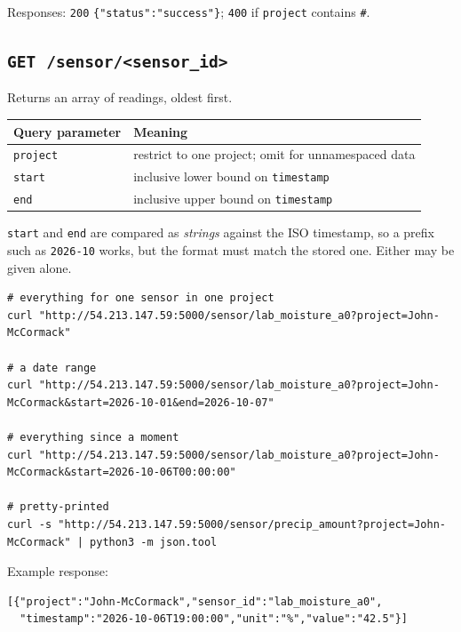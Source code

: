 \documentclass[11pt,a4paper]{article}
\newcommand{\http}[2]{\texttt{\textbf{#1}}~\texttt{#2}}
\begin{document}
\noindent Responses: \texttt{200} \texttt{\{"status":"success"\}};
\texttt{400} if \texttt{project} contains \texttt{\#}.

\subsection{\http{GET}{/sensor/<sensor\_id>}}

Returns an array of readings, oldest first.

\begin{center}
\begin{tabular}{@{}lp{10.4cm}@{}}
\toprule
Query parameter & Meaning \\
\midrule
\texttt{project} & restrict to one project; omit for unnamespaced data \\
\texttt{start}   & inclusive lower bound on \texttt{timestamp} \\
\texttt{end}     & inclusive upper bound on \texttt{timestamp} \\
\bottomrule
\end{tabular}
\end{center}

\noindent \texttt{start} and \texttt{end} are compared as \emph{strings}
against the ISO timestamp, so a prefix such as \texttt{2026-10} works, but
the format must match the stored one. Either may be given alone.

\begin{lstlisting}
# everything for one sensor in one project
curl "http://54.213.147.59:5000/sensor/lab_moisture_a0?project=John-McCormack"

# a date range
curl "http://54.213.147.59:5000/sensor/lab_moisture_a0?project=John-McCormack&start=2026-10-01&end=2026-10-07"

# everything since a moment
curl "http://54.213.147.59:5000/sensor/lab_moisture_a0?project=John-McCormack&start=2026-10-06T00:00:00"

# pretty-printed
curl -s "http://54.213.147.59:5000/sensor/precip_amount?project=John-McCormack" | python3 -m json.tool
\end{lstlisting}

\noindent Example response:

\begin{lstlisting}
[{"project":"John-McCormack","sensor_id":"lab_moisture_a0",
  "timestamp":"2026-10-06T19:00:00","unit":"%","value":"42.5"}]
\end{lstlisting}
\end{document}
